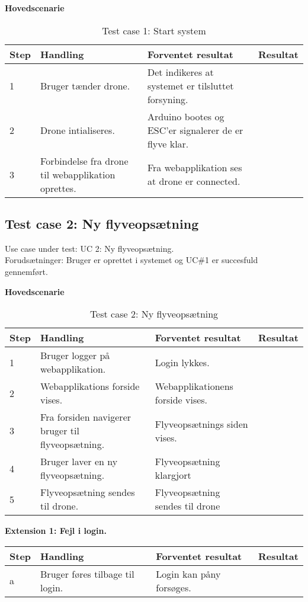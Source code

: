 \textbf{Hovedscenarie}
\begin{table}[H]
	\centering
		\begin{tabular}{|l|p{5 cm}|p{5 cm}|p{3.5 cm}|} 
		\hline
			Step & Handling & Forventet resultat & Resultat\\ \hline
			1 & Bruger tænder drone. & Det indikeres at systemet er tilsluttet forsyning. &   \\ \hline
			2 & Drone intialiseres. & Arduino bootes og ESC'er signalerer de er flyve klar. &   \\ \hline
			3 & Forbindelse fra drone til webapplikation oprettes. & Fra webapplikation ses at drone er connected. &  \\ \hline
		\end{tabular}
	\caption{Test case 1: Start system}
\end{table}


\subsection*{Test case 2: Ny flyveopsætning}
Use case under test: UC 2: Ny flyveopsætning.\\
Forudsætninger:	Bruger er oprettet i systemet og UC\#1 er succesfuld gennemført.

\textbf{Hovedscenarie}
\begin{table}[H]
	\centering
		\begin{tabular}{|l|p{5 cm}|p{5 cm}|p{3.5 cm}|} 
		\hline
			Step & Handling & Forventet resultat & Resultat\\ \hline
			1 & Bruger logger på webapplikation. & Login lykkes. &  \\ \hline
			2 & Webapplikations forside vises. & Webapplikationens forside vises. &   \\ \hline
			3 & Fra forsiden navigerer bruger til flyveopsætning. & Flyveopsætnings siden vises. & \\ \hline
			4 & Bruger laver en ny flyveopsætning. & Flyveopsætning klargjort & \\ \hline
			5 & Flyveopsætning sendes til drone. & Flyveopsætning sendes til drone & \\ \hline
		\end{tabular}
	\caption{Test case 2: Ny flyveopsætning}
\end{table}

\textbf{Extension 1: Fejl i login.}
\begin{table}[H]
	\centering
		\begin{tabular}{|l|p{5 cm}|p{5 cm}|p{3.5 cm}|} 
		\hline
			Step & Handling & Forventet resultat & Resultat\\ \hline
			a & Bruger føres tilbage til login. & Login kan påny forsøges. & \\ \hline
		\end{tabular}
\end{table}

